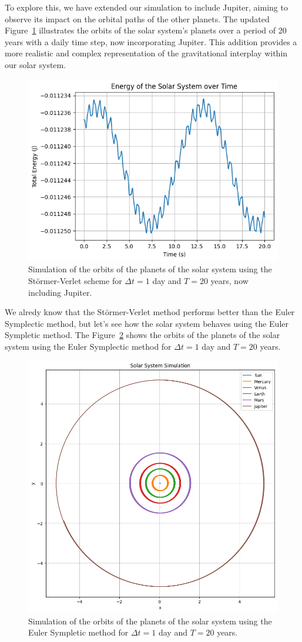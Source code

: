 \documentclass{report}
\begin{document}
To explore this, we have extended our simulation to include Jupiter, aiming to observe its impact on the orbital paths of the other planets. The updated Figure~\ref{fig:solarsystemjupiter} illustrates the orbits of the solar system's planets over a period of 20 years with a daily time step, now incorporating Jupiter. This addition provides a more realistic and complex representation of the gravitational interplay within our solar system.

\begin{figure}[H]
	\centering
	\includegraphics[width=0.5\linewidth]{./Figures/SolarSystem/orbitsjupiter.png}
	\caption{Simulation of the orbits of the planets of the solar system using the Störmer-Verlet scheme for \(\Delta t = 1\) day and \(T = 20\) years, now including Jupiter.}
	\label{fig:solarsystemjupiter}
\end{figure}


\label{sec:using_symplectic_euler_method}

We alredy know that the Störmer-Verlet method performs better than the Euler Symplectic method, but let's see how the solar system behaves using the Euler Sympletic method. The Figure~\ref{fig:solarsystemeuler} shows the orbits of the planets of the solar system using the Euler Symplectic method for \(\Delta t = 1\) day and \(T = 20\) years.

\begin{figure}[H]
	\centering
	\includegraphics[width=0.5\linewidth]{./Figures/SolarSystem/orbits_euler.png}
	\caption{Simulation of the orbits of the planets of the solar system using the Euler Sympletic method for \(\Delta t = 1\) day and \(T = 20\) years.}
	\label{fig:solarsystemeuler}
\end{figure}
\end{document}
